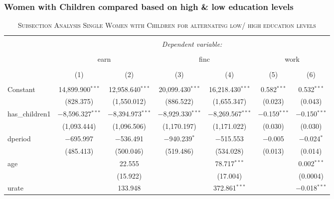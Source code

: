 \documentclass[a4paper]{article}
\begin{document}
\subsubsection{Women with Children compared based on high \& low education levels}
\begin{table}[!htbp] \centering 
\begin{adjustwidth}{0.cm}{-0cm}
\begin{threeparttable}
\small
\captionsetup{font=small, justification=raggedright,singlelinecheck=false}
\caption{\textsc{Subsection Analysis Single Women with Children for alternating low/ high education levels}}
\centering 
  \label{}
\small 
\begin{tabular}{@{\extracolsep{-2pt}}lcccccc} 
\\[-5.8ex]\hline 
\hline \\[-1.8ex] 
 & \multicolumn{6}{c}{\textit{Dependent variable:}} \\ 
\cline{2-7} 
\\[-1.8ex] & \multicolumn{2}{c}{earn} & \multicolumn{2}{c}{finc} & \multicolumn{2}{c}{work} \\ 
\\[-1.8ex] & (1) & (2) & (3) & (4) & (5) & (6)\\ 
\hline \\[-1.8ex] 
 Constant & 14,899.900$^{***}$ & 12,958.640$^{***}$ & 20,099.430$^{***}$ & 16,218.430$^{***}$ & 0.582$^{***}$ & 0.532$^{***}$ \\ 
  & (828.375) & (1,550.012) & (886.522) & (1,655.347) & (0.023) & (0.043) \\ 
  has\_children1 & $-$8,596.327$^{***}$ & $-$8,394.973$^{***}$ & $-$8,929.330$^{***}$ & $-$8,269.567$^{***}$ & $-$0.159$^{***}$ & $-$0.150$^{***}$ \\ 
  & (1,093.444) & (1,096.506) & (1,170.197) & (1,171.022) & (0.030) & (0.030) \\ 
  dperiod & $-$695.997 & $-$536.491 & $-$940.239$^{*}$ & $-$515.553 & $-$0.005 & $-$0.024$^{*}$ \\ 
  & (485.413) & (500.046) & (519.486) & (534.028) & (0.013) & (0.014) \\ 
  age &  & 22.555 &  & 78.717$^{***}$ &  & 0.002$^{***}$ \\ 
  &  & (15.922) &  & (17.004) &  & (0.0004) \\ 
  urate &  & 133.948 &  & 372.861$^{***}$ &  & $-$0.018$^{***}$ \\ 

\end{tabular}
\end{threeparttable}
\end{adjustwidth}
\end{table}
\end{document}
